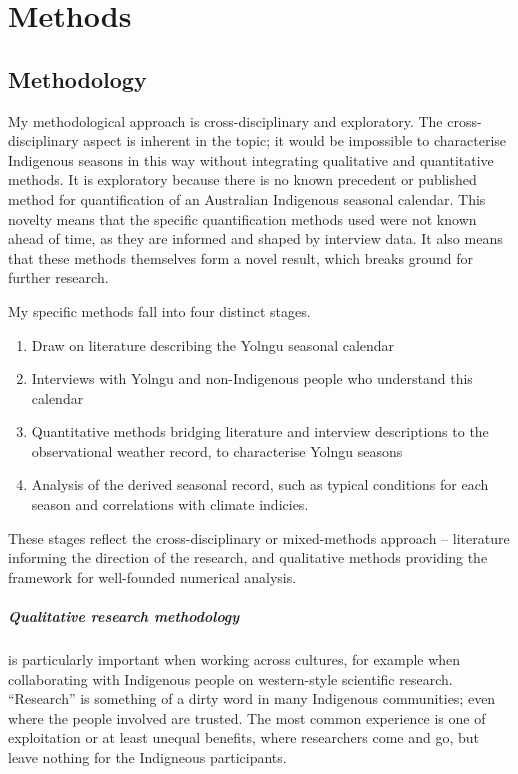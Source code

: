 \chapter{Methods}
\label{ch:methods}

\section{Methodology}

My methodological approach is cross-disciplinary and exploratory.
%
The cross-disciplinary aspect is inherent in the topic; it would
be impossible to characterise Indigenous seasons in this way without
integrating qualitative and quantitative methods.
%
It is exploratory because there is no known precedent or published
method for quantification of an Australian Indigenous seasonal calendar.
This novelty means that the specific quantification methods used
were not known ahead of time, as they are informed and shaped by
interview data.  It also means that these methods themselves form
a novel result, which breaks ground for further research.

My specific methods fall into four distinct stages.
\begin{enumerate}
\item Draw on literature describing the Yolngu seasonal calendar
\item Interviews with Yolngu and non-Indigenous people who
    understand this calendar
\item Quantitative methods bridging literature and interview
    descriptions to the observational weather record, to characterise
    Yolngu seasons
\item Analysis of the derived seasonal record, such as typical
    conditions for each season and correlations with climate indicies.
\end{enumerate}
These stages reflect the cross-disciplinary or mixed-methods approach --
literature informing the direction of the research, and qualitative
methods providing the framework for well-founded numerical analysis.


\paragraph{Qualitative research methodology} is particularly important
when working across cultures, for example when collaborating with
Indigenous people on western-style scientific research.
%
``Research'' is something of a dirty word in many Indigenous communities;
even where the people involved are trusted.  The most common experience
is one of exploitation or at least unequal benefits, where researchers
come and go, but leave nothing for the Indigneous participants.

